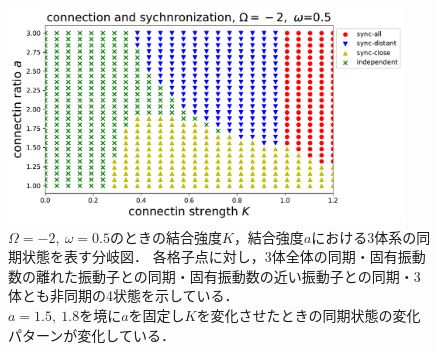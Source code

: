 \documentclass[../main]{subfiles}
\begin{document}
\begin{figure}[t]
\centering
\includegraphics[width=105mm]{./images/three-body-phase-boundary.pdf}
\centering
\caption{$\Omega=-2,\ \omega=0.5$のときの結合強度$K$，結合強度$a$における3体系の同期状態を表す分岐図．
各格子点に対し，3体全体の同期・固有振動数の離れた振動子との同期・固有振動数の近い振動子との同期・3体とも非同期の4状態を示している．\\
$a=1.5,\ 1.8$を境に$a$を固定し$K$を変化させたときの同期状態の変化パターンが変化している．}
\label{fig:3body-phase-boundary}
\end{figure}
\end{document}
